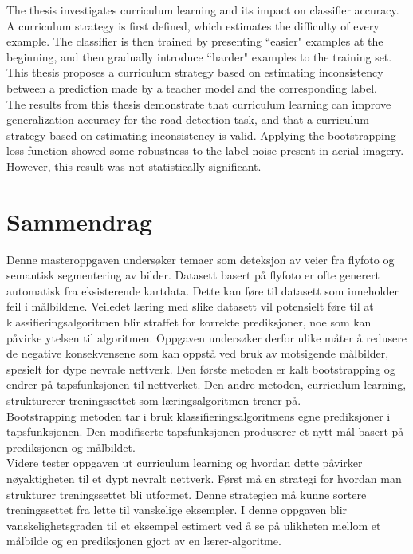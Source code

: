 \documentclass[a4paper]{book}
\begin{document}
The thesis investigates curriculum learning and its impact on classifier accuracy. A curriculum strategy is first defined, which estimates the difficulty of every example. The classifier is then trained by presenting ``easier" examples at the beginning, and then gradually introduce ``harder" examples to the training set. This thesis proposes a curriculum strategy based on estimating inconsistency between a prediction made by a teacher model and the corresponding label.\\

The results from this thesis demonstrate that curriculum learning can improve generalization accuracy for the road detection task, and that a curriculum strategy based on estimating inconsistency is valid. Applying the bootstrapping loss function showed some robustness to the label noise present in aerial imagery. However, this result was not statistically significant.

\clearpage
{} 
\section*{Sammendrag}
Denne masteroppgaven undersøker temaer som deteksjon av veier fra flyfoto og semantisk segmentering av bilder. Datasett basert på flyfoto er ofte generert automatisk fra eksisterende kartdata. Dette kan føre til datasett som inneholder feil i målbildene. Veiledet læring med slike datasett vil potensielt føre til at klassifieringsalgoritmen blir straffet for korrekte prediksjoner, noe som kan påvirke ytelsen til algoritmen. Oppgaven undersøker derfor ulike måter å redusere de negative konsekvensene som kan oppstå ved bruk av motsigende målbilder, spesielt for dype nevrale nettverk. Den første metoden er kalt bootstrapping og endrer på tapsfunksjonen til nettverket. Den andre metoden, curriculum learning, strukturerer treningssettet som læringsalgoritmen trener på.\\

Bootstrapping metoden tar i bruk klassifieringsalgoritmens egne prediksjoner i tapsfunksjonen. Den modifiserte tapsfunksjonen produserer et nytt mål basert på prediksjonen og målbildet.\\

Videre tester oppgaven ut curriculum learning og hvordan dette påvirker nøy\-aktig\-heten til et dypt nevralt nettverk. Først må en strategi for hvordan man strukturer treningssettet bli utformet. Denne strategien  må kunne sortere treningssettet fra lette til vanskelige eksempler. I denne oppgaven blir vanskelighetsgraden til et eksempel estimert ved å se på ulikheten mellom et målbilde og en prediksjonen gjort av en lærer-algoritme.\\
\end{document}
